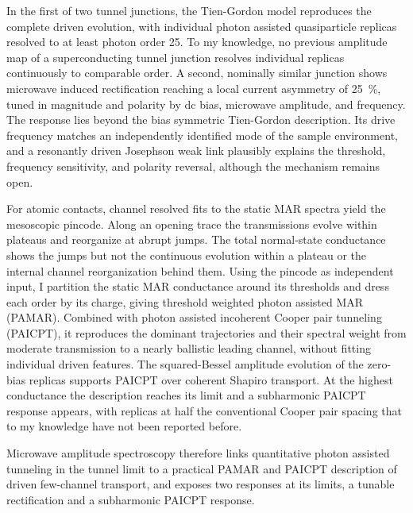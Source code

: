     In the first of two tunnel junctions, the Tien-Gordon model reproduces the complete driven evolution, with individual photon assisted quasiparticle replicas resolved to at least photon order 25. To my knowledge, no previous amplitude map of a superconducting tunnel junction resolves individual replicas continuously to comparable order. A second, nominally similar junction shows microwave induced rectification reaching a local current asymmetry of \qty{25}{\percent}, tuned in magnitude and polarity by dc bias, microwave amplitude, and frequency. The response lies beyond the bias symmetric Tien-Gordon description. Its drive frequency matches an independently identified mode of the sample environment, and a resonantly driven Josephson weak link plausibly explains the threshold, frequency sensitivity, and polarity reversal, although the mechanism remains open.
    
    For atomic contacts, channel resolved fits to the static MAR spectra yield the mesoscopic pincode. Along an opening trace the transmissions evolve within plateaus and reorganize at abrupt jumps. The total normal-state conductance shows the jumps but not the continuous evolution within a plateau or the internal channel reorganization behind them. Using the pincode as independent input, I partition the static MAR conductance around its thresholds and dress each order by its charge, giving threshold weighted photon assisted MAR (PAMAR). Combined with photon assisted incoherent Cooper pair tunneling (PAICPT), it reproduces the dominant trajectories and their spectral weight from moderate transmission to a nearly ballistic leading channel, without fitting individual driven features. The squared-Bessel amplitude evolution of the zero-bias replicas supports PAICPT over coherent Shapiro transport. At the highest conductance the description reaches its limit and a subharmonic PAICPT response appears, with replicas at half the conventional Cooper pair spacing that to my knowledge have not been reported before.
    
    Microwave amplitude spectroscopy therefore links quantitative photon assisted tunneling in the tunnel limit to a practical PAMAR and PAICPT description of driven few-channel transport, and exposes two responses at its limits, a tunable rectification and a subharmonic PAICPT response.
